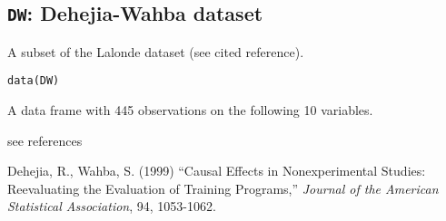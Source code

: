 \subsection{{\tt DW}: Dehejia-Wahba dataset}\label{ss:DW}
\begin{Description}\relax
A subset of the Lalonde dataset (see cited reference).
\end{Description}
\begin{Usage}
\begin{verbatim}data(DW)\end{verbatim}
\end{Usage}
\begin{Format}\relax
A data frame with 445 observations on the following 10 variables.
\end{Format}
\begin{Source}\relax
see references
\end{Source}
\begin{References}\relax
Dehejia, R., Wahba, S. (1999) ``Causal Effects in Nonexperimental Studies: 
Reevaluating the Evaluation of Training Programs,'' \emph{Journal of the American 
Statistical Association}, 94, 1053-1062.
\end{References}

